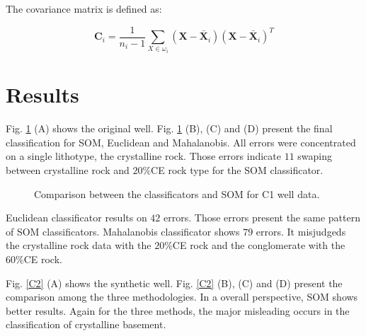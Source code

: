 \documentclass{cph18}
\begin{document}
The covariance matrix is defined as:

\begin{equation}
\textbf{C}_{i}=\frac{1}{n_{i}-1}\sum_{X \in \omega_{i}}(\textbf{X}-\bar{\textbf{X}}_{i})(\textbf{X}-\bar{\textbf{X}}_{i})^{T}
\label{eq6}
\end{equation}


\section{Results}
\label{Resultados}
Fig. \ref{C1} (A) shows the original well. Fig. \ref{C1} (B), (C) and (D) present the final classification for SOM, Euclidean and Mahalanobis. All errors were concentrated on a single lithotype, the crystalline rock. Those errors indicate $11$ swaping between crystalline rock and $20\%$CE rock type for the SOM classificator.    

\begin{figure}[H]
	\centering
	\setlength{\fboxsep}{8pt}
	\setlength{\fboxrule}{0.1pt}
	\caption{Comparison between the classificators and SOM for C1 well data. }
	\label{C1}
\end{figure}

Euclidean classificator results on $42$ errors. Those errors present the same pattern of SOM classificators. Mahalanobis classificator shows $79$ errors. It misjudgeds the crystalline rock data with the $20\%$CE rock and the conglomerate with the $60\%$CE rock. 

Fig. \ref{C2} (A) shows the synthetic well. Fig. \ref{C2} (B), (C) and (D) present the comparison among the three methodologies.  In a overall perspective, SOM shows better results. Again for the three methods, the major misleading occurs in the classification of crystalline basement.  
\end{document}
